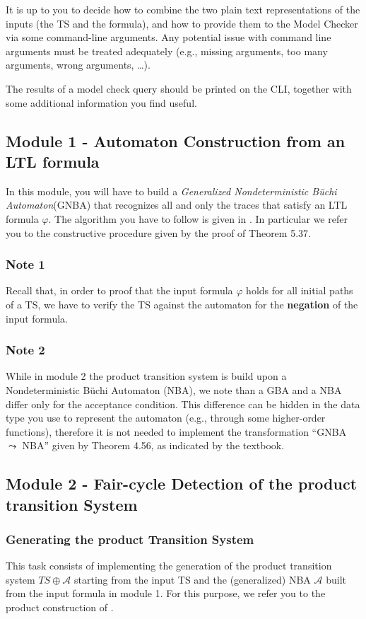 \documentclass{article}
\begin{document}
It is up to you to decide how to combine the two plain text representations of the inputs (the TS and the formula), 
and how to provide them to the Model Checker via some command-line arguments. Any potential issue with 
command line arguments must be treated adequately (e.g., missing arguments, too many arguments, wrong arguments, \dots).

The results of a model check query should be printed on the CLI, together with some additional 
information you find useful.

\subsection{Module 1 - Automaton Construction from an LTL formula}
In this module, you will have to build a \emph{Generalized Nondeterministic Büchi Automaton}(GNBA) 
that recognizes all and only the traces that satisfy an LTL formula $\varphi$. The algorithm you have to follow 
is given in \cite[Paragraph 5.2]{BaKa}. 
In particular we refer you to the constructive procedure given by the proof of Theorem 5.37.


\subsubsection*{Note 1}
Recall that, in order to proof that the input formula $\varphi$ holds for all initial paths of a TS, we have 
to verify the TS against the automaton for the \textbf{negation} of the input formula.

\subsubsection*{Note 2}
While in module 2 the product transition system is build upon a Nondeterministic Büchi Automaton (NBA), we note 
than a GBA and a NBA differ only for the acceptance condition. This difference can be hidden in the 
data type you use to represent the automaton (e.g., through some higher-order functions), 
therefore it is not needed to implement the transformation ``GNBA $\leadsto$ NBA'' given by Theorem 4.56, 
as indicated by the textbook.

\subsection{Module 2 - Fair-cycle Detection of the product transition System}
\subsubsection*{Generating the product Transition System}
This task consists of implementing the generation of the product transition system $TS \oplus \mathcal{A}$
starting from the input TS and the (generalized) NBA $\mathcal{A}$ built from the input formula in module 1.
For this purpose, we refer you to the product construction of \cite[Paragraph 4.4.1]{BaKa}.
\end{document}
